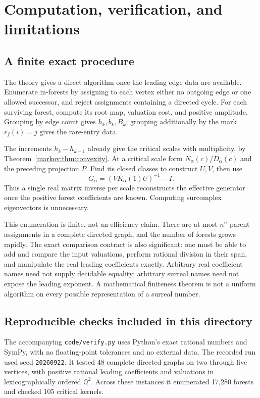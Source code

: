 \documentclass[11pt]{article}
\numberwithin{equation}{section}
\theoremstyle{definition}
\theoremstyle{remark}
\newcommand{\Q}{\mathbb Q}
\begin{document}
\section{Computation, verification, and limitations}\label{markov:sec:computation}

\subsection{A finite exact procedure}\label{markov:sec:procedure}

The theory gives a direct algorithm once the leading edge data are available.
Enumerate in-forests by assigning to each vertex either no outgoing edge or one
allowed successor, and reject assignments containing a directed cycle. For each
surviving forest, compute its root map, valuation cost, and positive amplitude.
Grouping by edge count gives $h_k,b_k,B_k$; grouping additionally by the mark
$r_f(i)=j$ gives the rare-entry data.

The increments $h_k-h_{k-1}$ already give the critical scales with multiplicity,
by Theorem~\ref{markov:thm:convexity}. At a critical scale form
$N_\alpha(c)/D_\alpha(c)$ and the preceding projection $P$. Find its closed
classes to construct $U,V$, then use
\[
 G_\alpha=(VK_\alpha(1)U)^{-1}-I.
\]
Thus a single real matrix inverse per scale reconstructs the effective generator
once the positive forest coefficients are known. Computing surcomplex eigenvectors
is unnecessary.

This enumeration is finite, not an efficiency claim. There are at most $n^n$
parent assignments in a complete directed graph, and the number of forests grows
rapidly. The exact comparison contract is also significant: one must be able to
add and compare the input valuations, perform rational division in their span,
and manipulate the real leading coefficients exactly. Arbitrary real coefficient
names need not supply decidable equality; arbitrary surreal names need not expose
the leading exponent. A mathematical finiteness theorem is not a uniform
algorithm on every possible representation of a surreal number.

\subsection{Reproducible checks included in this directory}\label{markov:sec:checks}

The accompanying \texttt{code/verify.py} uses Python's exact rational numbers and
SymPy, with no floating-point tolerances and no external data. The recorded run
used seed \texttt{20260922}. It tested 48 complete directed graphs on two through
five vertices, with positive rational leading coefficients and valuations in
lexicographically ordered $\Q^2$. Across these instances it enumerated 17,280
forests and checked 105 critical kernels.
\end{document}
